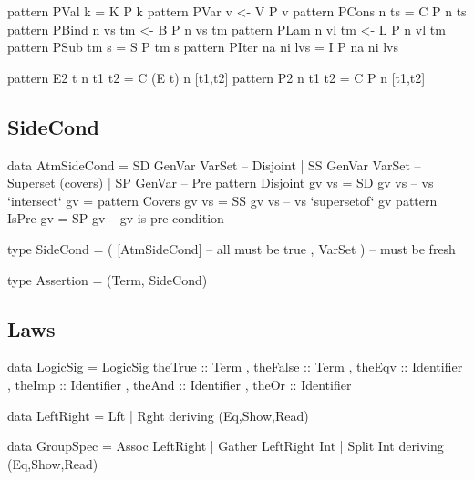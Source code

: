 \begin{code}
pattern PVal k             =  K P k
pattern PVar v            <-  V P v
pattern PCons n ts         =  C P n ts
pattern PBind n vs tm     <-  B P n vs tm
pattern PLam n vl tm      <-  L P n vl tm
pattern PSub tm s          =  S P tm s
pattern PIter na ni lvs    =  I P na ni lvs
\end{code}

\begin{code}
pattern E2 t n t1 t2  = C (E t) n [t1,t2]
pattern P2   n t1 t2  = C P     n [t1,t2]
\end{code}



\subsection{SideCond}

\begin{code}
data AtmSideCond
 = SD  GenVar VarSet -- Disjoint
 | SS  GenVar VarSet -- Superset (covers)
 | SP  GenVar        -- Pre
pattern Disjoint gv vs = SD  gv vs  --  vs `intersect`  gv = {}
pattern Covers   gv vs = SS  gv vs  --  vs `supersetof` gv
pattern IsPre    gv    = SP  gv     --  gv is pre-condition
\end{code}

\begin{code}
type SideCond = ( [AtmSideCond]  -- all must be true
                , VarSet )       -- must be fresh
\end{code}

\begin{code}
type Assertion = (Term, SideCond)
\end{code}

\newpage
\subsection{Laws}

\begin{code}
data LogicSig
  = LogicSig
     { theTrue  :: Term
     , theFalse :: Term
     , theEqv   :: Identifier
     , theImp   :: Identifier
     , theAnd   :: Identifier
     , theOr    :: Identifier
     }
\end{code}

\begin{code}
data LeftRight = Lft | Rght deriving (Eq,Show,Read)

data GroupSpec
  = Assoc LeftRight
  | Gather LeftRight Int
  | Split Int
  deriving (Eq,Show,Read)
\end{code}


